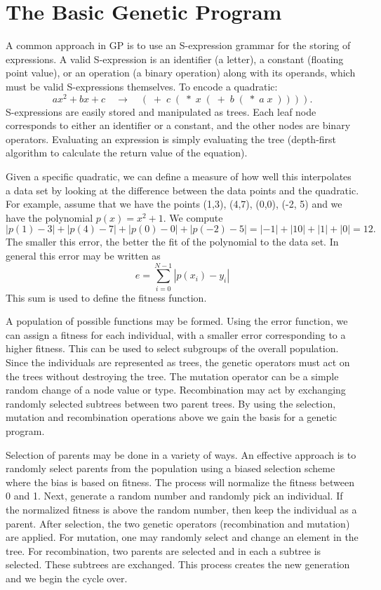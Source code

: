 \documentclass[12pt]{article}
\begin{document}
\section{ The Basic Genetic Program}

A common approach in GP is to use an S-expression grammar for the
storing of expressions.  A valid S-expression is an identifier (a
letter), a constant (floating point value), or an operation (a binary
operation) along with its operands, which must be valid S-expressions
themselves.  To encode a quadratic:
$$ax^2 + bx + c \quad\to\quad 
(\; +\; c\; (\;*\; x\; (\;+\; b\; (\;*\; a\; x\;)))).$$ 
S-expressions
are easily stored and manipulated as trees.  Each leaf node
corresponds to either an identifier or a constant, and the other nodes
are binary operators.  Evaluating an expression is simply evaluating
the tree (depth-first algorithm to calculate the return value of the
equation).

Given a specific quadratic, we can define a measure of how well this
interpolates a data set by looking at the difference between the data
points and the quadratic.  For example, assume that we have the points
(1,3), (4,7), (0,0), (-2, 5) and we have the polynomial $p(x) = x^2
+1$.  We compute
$$|p(1) -3| + |p(4)-7| + |p(0)-0| + |p(-2)-5| = |-1| + |10| + |1| +
|0|=12.$$ The smaller this error, the better the fit of the polynomial
to the data set.  In general this error may be written as
$$e = \sum_{i=0}^{N-1}\left| p(x_i)-y_i\right|$$
This sum is used to
define the fitness function.

A population of possible functions may be formed.  Using the error
function, we can assign a fitness for each individual, with a smaller
error corresponding to a higher fitness.  This can be used to select
subgroups of the overall population.  Since the individuals are
represented as trees, the genetic operators must act on the trees
without destroying the tree.  The mutation operator can be a simple
random change of a node value or type.  Recombination may act by
exchanging randomly selected subtrees between two parent trees.  By
using the selection, mutation and recombination operations above we
gain the basis for a genetic program.


Selection of parents may be done in a variety of ways.  An effective
approach is to randomly select parents from the population using a
biased selection scheme where the bias is based on fitness. The
process will normalize the fitness between 0 and 1.  Next, generate a
random number and randomly pick an individual.  If the normalized
fitness is above the random number, then keep the individual as a
parent. After selection, the two genetic operators (recombination and
mutation) are applied.  For mutation, one may randomly select and
change an element in the tree.  For recombination, two parents are
selected and in each a subtree is selected.  These subtrees are
exchanged.  This process creates the new generation and we begin the
cycle over.
\end{document}
